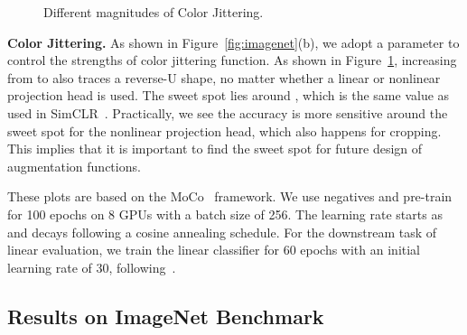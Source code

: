 \documentclass{article}
\begin{document}
\begin{figure}[ht]
\caption{Different magnitudes of Color Jittering.}
\label{fig:imagenet_color}
\end{figure} \textbf{Color Jittering.} As shown in Figure~\ref{fig:imagenet}(b), we adopt a parameter  to control the strengths of color jittering function. As shown in Figure~\ref{fig:imagenet_color}, increasing  from  to  also traces a reverse-U shape, no matter whether a linear or nonlinear projection head is used. The sweet spot lies around , which is the same value as used in SimCLR~\cite{chen2020simple}. Practically, we see the accuracy is more sensitive around the sweet spot for the nonlinear projection head, which also happens for cropping. This implies that it is important to find the sweet spot for future design of augmentation functions.

 These plots are based on the MoCo~\cite{he2019momentum} framework. We use  negatives and pre-train for 100 epochs on 8 GPUs with a batch size of 256. The learning rate starts as  and decays following a cosine annealing schedule. For the downstream task of linear evaluation, we train the linear classifier for 60 epochs with an initial learning rate of 30, following~\cite{tian2019contrastive}. 

\subsection{Results on ImageNet Benchmark}
\end{document}
